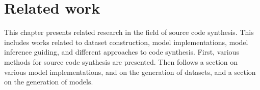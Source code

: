 \chapter{Related work}
\label{chap:related-work}

This chapter presents related research in the field of source code synthesis. This includes works related to dataset construction, model implementations, model inference guiding, and different approaches to code synthesis. First, various methods for source code synthesis are presented. Then follows a section on various model implementations, and on the generation of datasets, and a section on the generation of models.

%
%
%
%
%
%
%
%
%
%
%
%
%
%
%
